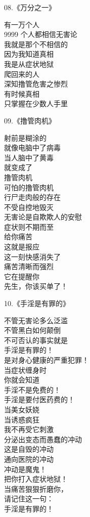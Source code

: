 \documentclass{ctexart}
\begin{document}
\begin{multicols}{2}
    \begin{center}
        08.《万分之一》\it

        有一万个人 \\ 9999 个人都相信无害论 \\ 我就是那个不相信的 \\ 因为我知道真相 \\ 我是从症状地狱 \\ 爬回来的人 \\ 深知撸管危害之惨烈 \\ 有时候真相 \\ 只掌握在少数人手里
    \end{center}

    \begin{center}
        09.《撸管肉机》\it

        射前是糊涂的 \\ 就像电脑中了病毒 \\ 当人脑中了黄毒 \\ 就变成了 \\ 撸管肉机 \\ 可怕的撸管肉机 \\ 行尸走肉般的存在 \\ 不受自控地毁灭 \\ 无害论是自欺欺人的安慰 \\ 症状则不期而至 \\ 给你痛苦 \\ 这就是报应 \\ 这一刻快感消失了 \\ 痛苦清晰而强烈 \\ 它在提醒你 \\ 先生，你该买单了！
    \end{center}

    \begin{center}
        10.《手淫是有罪的》\it

        不管无害论多么泛滥 \\ 不管黑白如何颠倒 \\ 不可否认的事实就是 \\ 手淫是有罪的！ \\ 是对身心健康的严重犯罪！ \\ 当症状缠身时 \\ 你就会知道 \\ 手淫不是免费的！ \\ 手淫是要付医药费的！ \\ 当美女妖娆 \\ 当诱惑疯狂 \\ 我不再受它刺激 \\ 分泌出变态而愚蠢的冲动 \\ 这是自毁的冲动 \\ 通向医院的冲动 \\ 冲动是魔鬼！ \\ 把你打入症状地狱！ \\ 当痛苦狠狠折磨你， \\ 请记住这一句： \\ 手淫是有罪的！
    \end{center}
\end{multicols}
\end{document}
